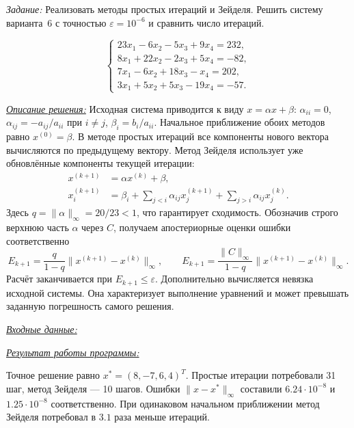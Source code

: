 \documentclass[a4paper,12pt]{article}
\newcommand{\labheading}[1]{\clearpage\noindent\hspace*{\parindent}{\fontsize{16}{19}\selectfont\bfseries Лабораторная работа № #1}\par\vspace{11pt}}
\newcommand{\task}[1]{\indent\textit{Задание:} #1\par}
\newcommand{\solution}[1]{\par\vspace{9pt}\indent\underline{\textit{Описание решения:}} #1}
\newcommand{\blocktitle}[1]{\par\Needspace{4\baselineskip}\vspace{9pt}\indent\underline{\textit{#1}}\par\vspace{4pt}}
\begin{document}
\labheading{1.3}
\task{Реализовать методы простых итераций и Зейделя. Решить систему
варианта~6 с точностью $\varepsilon=10^{-6}$ и сравнить число итераций.}
\[
\begin{cases}
23x_1-6x_2-5x_3+9x_4=232,\\
8x_1+22x_2-2x_3+5x_4=-82,\\
7x_1-6x_2+18x_3-x_4=202,\\
3x_1+5x_2+5x_3-19x_4=-57.
\end{cases}
\]
\solution{}
Исходная система приводится к виду $x=\alpha x+\beta$:
$\alpha_{ii}=0$, $\alpha_{ij}=-a_{ij}/a_{ii}$ при $i\ne j$,
$\beta_i=b_i/a_{ii}$. Начальное приближение обоих методов равно
$x^{(0)}=\beta$. В методе простых итераций все компоненты нового
вектора вычисляются по предыдущему вектору. Метод Зейделя использует
уже обновлённые компоненты текущей итерации:
\[
\begin{aligned}
x^{(k+1)}&=\alpha x^{(k)}+\beta,\\
x_i^{(k+1)}&=\beta_i+\sum_{j<i}\alpha_{ij}x_j^{(k+1)}
+\sum_{j>i}\alpha_{ij}x_j^{(k)}.
\end{aligned}
\]
Здесь $q=\|\alpha\|_\infty=20/23<1$, что гарантирует сходимость.
Обозначив строго верхнюю часть $\alpha$ через $C$, получаем
апостериорные оценки ошибки соответственно
\[
E_{k+1}=\frac{q}{1-q}\|x^{(k+1)}-x^{(k)}\|_\infty,
\qquad
E_{k+1}=\frac{\|C\|_\infty}{1-q}\|x^{(k+1)}-x^{(k)}\|_\infty.
\]
Расчёт заканчивается при $E_{k+1}\le\varepsilon$. Дополнительно
вычисляется невязка исходной системы. Она характеризует выполнение
уравнений и может превышать заданную погрешность самого решения.
\blocktitle{Входные данные:}
\blocktitle{Результат работы программы:}
Точное решение равно $x^*=(8,-7,6,4)^T$.
Простые итерации потребовали 31 шаг, метод Зейделя --- 10 шагов.
Ошибки $\|x-x^*\|_\infty$ составили $6.24\cdot10^{-8}$
и $1.25\cdot10^{-8}$ соответственно. При одинаковом начальном
приближении метод Зейделя потребовал в $3.1$ раза меньше итераций.
\end{document}
